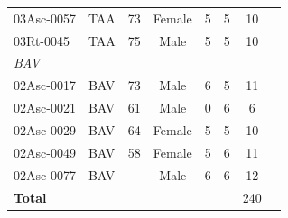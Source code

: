 \documentclass[11pt,a4paper]{article}
\begin{document}
\begin{longtable}{llcccccc}
  03Asc-0057 & TAA & 73 & Female & 5 & 5 & 10 \\
  03Rt-0045 & TAA & 75 & Male & 5 & 5 & 10 \\
\midrule
\multicolumn{7}{l}{\textit{BAV}} \\
  02Asc-0017 & BAV & 73 & Male & 6 & 5 & 11 \\
  02Asc-0021 & BAV & 61 & Male & 0 & 6 & 6 \\
  02Asc-0029 & BAV & 64 & Female & 5 & 5 & 10 \\
  02Asc-0049 & BAV & 58 & Female & 5 & 6 & 11 \\
  02Asc-0077 & BAV & -- & Male & 6 & 6 & 12 \\
\midrule
  \textbf{Total} & & & & & & 240 \\
\bottomrule
\end{longtable}
\end{document}
